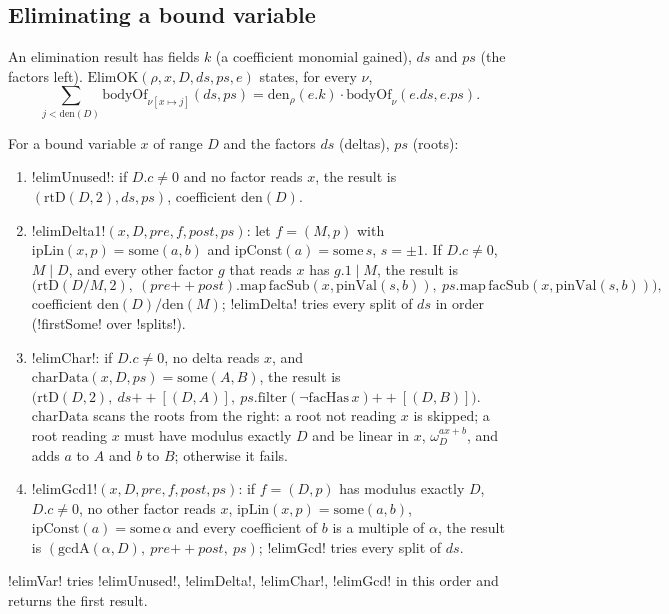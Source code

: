\subsection{Eliminating a bound variable}

\begin{definition}
An elimination result has fields $k$ (a coefficient monomial gained), $ds$ and $ps$ (the factors left). $\mathrm{ElimOK}(\rho,x,D,ds,ps,e)$ states, for every $\nu$,
\[
\sum_{j<\mathrm{den}(D)}\mathrm{bodyOf}_{\nu[x\mapsto j]}(ds,ps)=\mathrm{den}_\rho(e.k)\cdot\mathrm{bodyOf}_\nu(e.ds,e.ps).
\]
\end{definition}

\begin{definition}\label{def:lean-sym-elims}
For a bound variable $x$ of range $D$ and the factors $ds$ (deltas), $ps$ (roots):
\begin{enumerate}
\item \lean!elimUnused!: if $D.c\neq0$ and no factor reads $x$, the result is $(\mathrm{rtD}(D,2),ds,ps)$, coefficient $\mathrm{den}(D)$.
\item \lean!elimDelta1!$(x,D,\mathit{pre},f,\mathit{post},ps)$: let $f=(M,p)$ with $\mathrm{ipLin}(x,p)=\mathrm{some}(a,b)$ and $\mathrm{ipConst}(a)=\mathrm{some}\,s$, $s=\pm1$. If $D.c\neq0$, $M\mid D$, and every other factor $g$ that reads $x$ has $g.1\mid M$, the result is
\[
\bigl(\mathrm{rtD}(D/M,2),\ (\mathit{pre}\mathbin{+\!\!+}\mathit{post}).\mathrm{map}\,\mathrm{facSub}(x,\mathrm{pinVal}(s,b)),\ ps.\mathrm{map}\,\mathrm{facSub}(x,\mathrm{pinVal}(s,b))\bigr),
\]
coefficient $\mathrm{den}(D)/\mathrm{den}(M)$; \lean!elimDelta! tries every split of $ds$ in order (\lean!firstSome! over \lean!splits!).
\item \lean!elimChar!: if $D.c\neq0$, no delta reads $x$, and $\mathrm{charData}(x,D,ps)=\mathrm{some}(A,B)$, the result is $\bigl(\mathrm{rtD}(D,2),\ ds\mathbin{+\!\!+}[(D,A)],\ ps.\mathrm{filter}(\lnot\mathrm{facHas}\,x)\mathbin{+\!\!+}[(D,B)]\bigr)$. $\mathrm{charData}$ scans the roots from the right: a root not reading $x$ is skipped; a root reading $x$ must have modulus exactly $D$ and be linear in $x$, $\omega_D^{ax+b}$, and adds $a$ to $A$ and $b$ to $B$; otherwise it fails.
\item \lean!elimGcd1!$(x,D,\mathit{pre},f,\mathit{post},ps)$: if $f=(D,p)$ has modulus exactly $D$, $D.c\neq0$, no other factor reads $x$, $\mathrm{ipLin}(x,p)=\mathrm{some}(a,b)$, $\mathrm{ipConst}(a)=\mathrm{some}\,\alpha$ and every coefficient of $b$ is a multiple of $\alpha$, the result is $(\mathrm{gcdA}(\alpha,D),\ \mathit{pre}\mathbin{+\!\!+}\mathit{post},\ ps)$; \lean!elimGcd! tries every split of $ds$.
\end{enumerate}
\lean!elimVar! tries \lean!elimUnused!, \lean!elimDelta!, \lean!elimChar!, \lean!elimGcd! in this order and returns the first result.
\end{definition}

